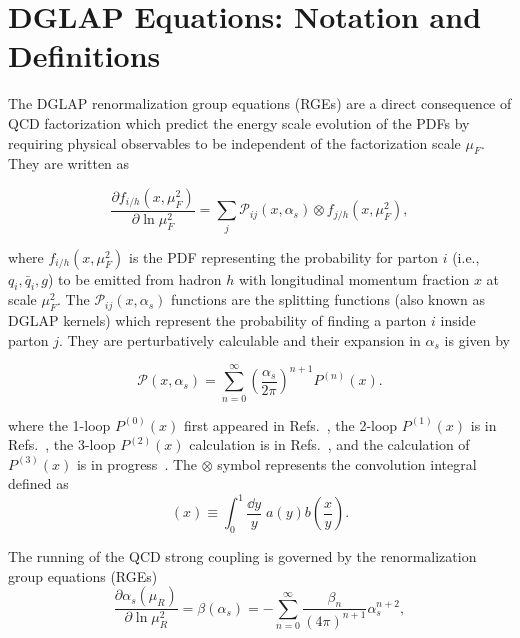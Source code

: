\documentclass[12pt,notitlepage,aps,preprintnumbers,superscriptaddress,nofootinbib,aps,prd,floatfix]{revtex4-2}
\newcommand{\ddp}{\partial}
\begin{document}
\section{DGLAP Equations: Notation and Definitions}
\label{Notation}

The DGLAP renormalization group equations (RGEs) are a direct consequence of QCD factorization which predict the energy scale evolution of the PDFs by requiring physical observables to be independent of the factorization scale $\mu_F$. They are written as

\begin{equation}
  \frac{\ddp f_{i/h}(x,\mu_F^2)}{\ddp \ln \mu_F^2} =\sum_{j} \mathcal{P}_{ij}(x,\alpha_s) \otimes f_{j/h}(x,\mu_F^2),
\label{eq:dglap}
\end{equation}

where $f_{i/h}(x,\mu_F^2)$ is the PDF representing the probability for parton $i$ (i.e., $q_i,{\bar q}_i, g$) to be emitted from hadron $h$ with longitudinal momentum fraction $x$ at scale $\mu_F^2$. The $\mathcal{P}_{ij}(x,\alpha_s)$ functions are the splitting functions (also known as DGLAP kernels) which represent the probability of finding a parton $i$ inside parton $j$. They are perturbatively calculable and their expansion
in $\alpha_s$ is given by

\begin{equation}
  \mathcal{P}(x,\alpha_s) = \sum_{n=0}^{\infty} \left( \frac{\alpha_s}{2\pi} \right)^{n+1} P^{(n)}(x).
\end{equation}

where the 1-loop $P^{(0)}(x)$ first appeared in Refs.~\cite{Gross:1973id,Politzer:1974fr,Altarelli:1977zs}, the 2-loop $P^{(1)}(x)$ is in Refs.~\cite{Floratos:1977au,Floratos:1978ny,Gonzalez-Arroyo:1979guc,Gonzalez-Arroyo:1979qht,Curci:1980uw,Furmanski:1980cm,Floratos:1981hs,Hamberg:1991qt}, the 3-loop $P^{(2)}(x)$ calculation is  in Refs.~\cite{Moch:2004pa,Vogt:2004mw}, and the calculation of $P^{(3)}(x)$ is in progress~\cite{Gracey:1994nn,Davies:2016jie,Moch:2017uml,Gehrmann:2023cqm,Falcioni:2023tzp,Gehrmann:2023iah,Kniehl:2025ttz}. The $\otimes$ symbol represents the convolution integral defined as
%
\begin{equation}
  [a \otimes b](x) \equiv \int_0^1 \frac{\dd y}{y} \; a(y) b\left( \frac{x}{y} \right).
\end{equation}

The running of the QCD strong coupling is governed by the renormalization group equations (RGEs)  
%
\begin{equation}
\frac{\ddp \alpha_s(\mu_R)}{\ddp \ln \mu_R^2} = \beta(\alpha_s) = -\sum_{n=0}^{\infty} \frac{\beta_n}{(4\pi)^{n+1}} \alpha_s^{n+2},
\label{eq:1-basics-betafn}
\end{equation}
\end{document}
